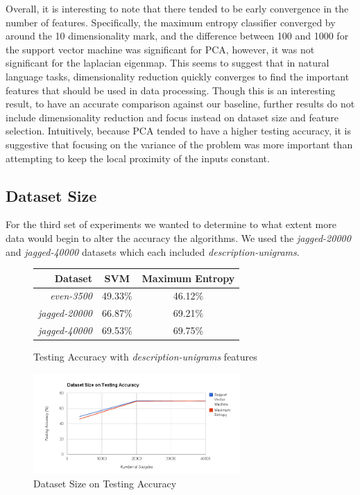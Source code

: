 Overall, it is interesting to note that there tended to be early convergence in the number of features.  Specifically, the maximum entropy classifier converged by around the 10 dimensionality mark, and the difference between 100 and 1000 for the support vector machine was significant for PCA, however, it was not significant for the laplacian eigenmap.  This seems to suggest that in natural language tasks, dimensionality reduction quickly converges to find the important features that should be used in data processing.  Though this is an interesting result, to have an accurate comparison against our baseline, further results do not include dimensionality reduction and focus instead on dataset size and feature selection.  Intuitively, because PCA tended to have a higher testing accuracy, it is suggestive that focusing on the variance of the problem was more important than attempting to keep the local proximity of the inputs constant.

\subsection{Dataset Size}
For the third set of experiments we wanted to determine to what extent more data would begin to alter the accuracy the algorithms.  We used the \emph{jagged-20000} and \emph{jagged-40000} datasets which each included \emph{description-unigrams}.

\begin{figure}[!h]
\begin{center}
\caption{Testing Accuracy with \emph{description-unigrams} features}
\begin{tabular}{| r | c | c |}
\hline
\textbf{Dataset} & \textbf{SVM} & \textbf{Maximum Entropy} \\ \hline
\emph{even-3500} & 49.33\% & 46.12\% \\ \hline
\emph{jagged-20000} & 66.87\% & 69.21\% \\ \hline
\emph{jagged-40000} & 69.53\% & 69.75\% \\ \hline
\end{tabular}
\end{center}
\end{figure}

\begin{figure}[!h]
\begin{center}
\caption{Dataset Size on Testing Accuracy}
\includegraphics[width=0.7\textwidth]{Dataset_Accuracy.png}
\end{center}
\end{figure}

